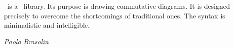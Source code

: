




\thispagestyle{empty}
\noindent
{}\\[0.62em]
\\[1.62em]
\par
\vfill
{}


\newpage
\noindent\koDi\ is a \TikZ\ library. Its purpose
is drawing commutative diagrams.
It is designed precisely to overcome
the shortcomings of traditional ones.
The syntax is minimalistic and intelligible.\par
\hfill{\itshape Paolo Brasolin}

